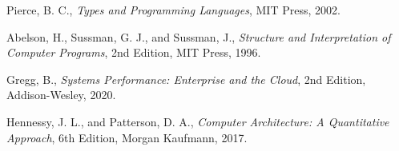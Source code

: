 
\vspace{0.3cm}

\noindent [23] Pierce, B. C., \textit{Types and Programming Languages}, MIT Press, 2002.

\vspace{0.2cm}

\noindent [24] Abelson, H., Sussman, G. J., and Sussman, J., \textit{Structure and Interpretation of Computer Programs}, 2nd Edition, MIT Press, 1996.


\vspace{0.3cm}

\noindent [25] Gregg, B., \textit{Systems Performance: Enterprise and the Cloud}, 2nd Edition, Addison-Wesley, 2020.

\vspace{0.2cm}

\noindent [26] Hennessy, J. L., and Patterson, D. A., \textit{Computer Architecture: A Quantitative Approach}, 6th Edition, Morgan Kaufmann, 2017.
